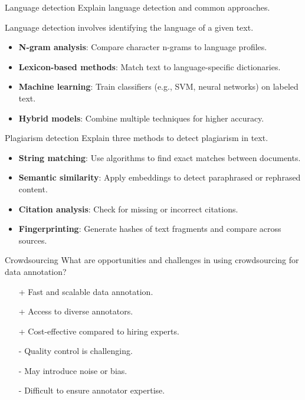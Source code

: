 \documentclass{article}
\begin{document}
\begin{exercise}{Language detection}
  Explain language detection and common approaches.

  \begin{solution}
    Language detection involves identifying the language of a given text.
    \begin{itemize}
        \item \textbf{N-gram analysis}: Compare character n-grams to language profiles.
        \item \textbf{Lexicon-based methods}: Match text to language-specific dictionaries.
        \item \textbf{Machine learning}: Train classifiers (e.g., SVM, neural networks) on labeled text.
        \item \textbf{Hybrid models}: Combine multiple techniques for higher accuracy.
    \end{itemize}
  \end{solution}
\end{exercise}

\begin{exercise}{Plagiarism detection}
  Explain three methods to detect plagiarism in text.

  \begin{solution}
    \begin{itemize}
        \item \textbf{String matching}: Use algorithms to find exact matches between documents.
        \item \textbf{Semantic similarity}: Apply embeddings to detect paraphrased or rephrased content.
        \item \textbf{Citation analysis}: Check for missing or incorrect citations.
        \item \textbf{Fingerprinting}: Generate hashes of text fragments and compare across sources.
    \end{itemize}
  \end{solution}
\end{exercise}

\begin{exercise}{Crowdsourcing}
  What are opportunities and challenges in using crowdsourcing for data annotation?

  \begin{solution}
    \begin{itemize}
        \item[+] Fast and scalable data annotation.
        \item[+] Access to diverse annotators.
        \item[+] Cost-effective compared to hiring experts.
        \item[-] Quality control is challenging.
        \item[-] May introduce noise or bias.
        \item[-] Difficult to ensure annotator expertise.
    \end{itemize}
  \end{solution}
\end{exercise}
\end{document}
